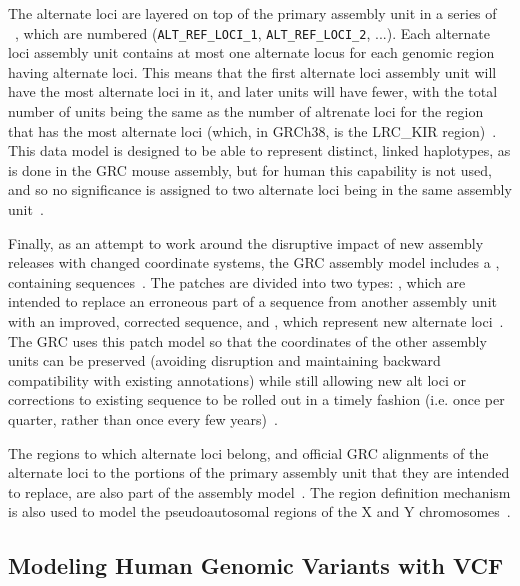 The alternate loci are layered on top of the primary assembly unit in a series of ~\cite{schneider2013genome}, which are numbered (\texttt{ALT\_REF\_LOCI\_1}, \texttt{ALT\_REF\_LOCI\_2}, ...). Each alternate loci assembly unit contains at most one alternate locus for each genomic region having alternate loci. This means that the first alternate loci assembly unit will have the most alternate loci in it, and later units will have fewer, with the total number of units being the same as the number of altrenate loci for the region that has the most alternate loci (which, in GRCh38, is the LRC\_KIR region)~\cite{grc2013announcing,schneider2013genome}. This data model is designed to be able to represent distinct, linked haplotypes, as is done in the GRC mouse assembly, but for human this capability is not used, and so no significance is assigned to two alternate loci being in the same assembly unit~\cite{schneider2013genome}.

Finally, as an attempt to work around the disruptive impact of new assembly releases with changed coordinate systems, the GRC assembly model includes a , containing  sequences~\cite{schneider2013genome}. The patches are divided into two types: , which are intended to replace an erroneous part of a sequence from another assembly unit with an improved, corrected sequence, and , which represent new alternate loci~\cite{schneider2013genome}. The GRC uses this patch model so that the coordinates of the other assembly units can be preserved (avoiding disruption and maintaining backward compatibility with existing annotations) while still allowing new alt loci or corrections to existing sequence to be rolled out in a timely fashion (i.e. once per quarter, rather than once every few years)~\cite{schneider2013genome}.

The regions to which alternate loci belong, and official GRC alignments of the alternate loci to the portions of the primary assembly unit that they are intended to replace, are also part of the assembly model~\cite{schneider2013genome}. The region definition mechanism is also used to model the pseudoautosomal regions of the X and Y chromosomes~\cite{schneider2013genome}.
    
\subsection{Modeling Human Genomic Variants with VCF}

